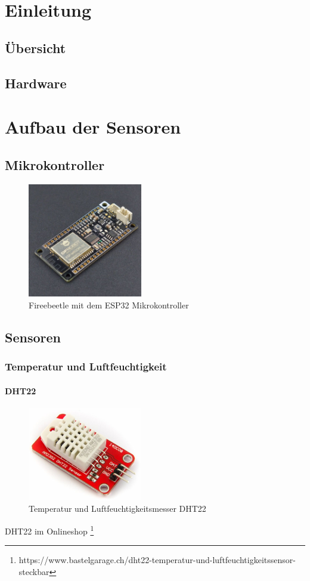 \documentclass[
  10pt, %
  a4paper, %
  twoside, %
  openright, %
  numbers=noenddot, %
  BCOR=5mm, %
  parskip=half*, %
  thesis, %
]{bfhbook}
\begin{document}
\chapter{Einleitung}
\section{Übersicht}
\section{Hardware}
\chapter{Aufbau der Sensoren}
\section{Mikrokontroller}
\begin{figure}[htp]
  \begin{center}
    \includegraphics[width=5cm, left]{Bilder/Firebeetle.jpg}
  \end{center}
    \caption{Fireebeetle mit dem ESP32 Mikrokontroller}
  \label{fig:test1}
\end{figure}

 \section{Sensoren}
 \subsection{Temperatur und Luftfeuchtigkeit}
 \subsubsection{DHT22}
 \begin{figure}[htp]
  \begin{center}
    \includegraphics[width=5cm, left]{Bilder/DHT22.jpg}
  \end{center}
    \caption{Temperatur und Luftfeuchtigkeitsmesser DHT22}
  \label{fig:dht22}
\end{figure}
DHT22 im Onlineshop \footnote{https://www.bastelgarage.ch/dht22-temperatur-und-luftfeuchtigkeitssensor-steckbar}
\end{document}
